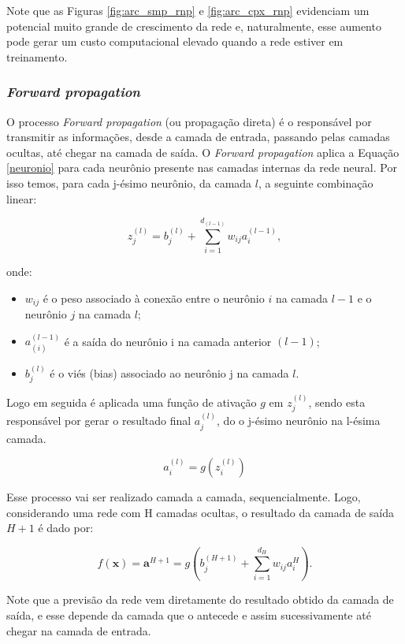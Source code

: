 Note que as Figuras \ref{fig:arc_smp_rnp} e \ref{fig:arc_cpx_rnp} evidenciam um potencial muito grande de crescimento 
da rede e, naturalmente, esse aumento pode gerar um custo computacional elevado quando a rede estiver em treinamento.

\vspace{1cm}

\subsubsection{\textit{Forward propagation}}

O processo \textit{Forward propagation} (ou propagação direta) é o responsável por transmitir as informações,
 desde a camada de entrada, passando pelas camadas ocultas, até chegar na camada de saída. O \textit{Forward propagation}
  aplica a Equação \ref{neuronio} para cada neurônio presente nas camadas internas da rede neural. 
  Por isso temos, para cada j-ésimo neurônio, da camada $l$, a seguinte combinação linear:

\[
z_{j}^{(l)} = b_{j}^{(l)} + \sum_{i=1}^{d_{(l-1)}} w_{ij}a_{i}^{(l-1)} ,
\]

\noindent onde:
\begin{itemize}
    \item $w_{ij}$ é o peso associado à conexão entre o neurônio $i$ na camada $l-1$ e o neurônio $j$ na camada $l$;
    \item $a_{(i)}^{(l-1)}$ é a saída do neurônio i na camada anterior $(l-1)$;
    \item $b_{j}^{(l)}$ é o viés (bias) associado ao neurônio j na camada $l$.
\end{itemize}

Logo em seguida é aplicada uma função de ativação $g$ em $z_{j}^{(l)}$, sendo esta responsável por gerar o
 resultado final $a_{j}^{(l)}$, do o j-ésimo neurônio na l-ésima camada.

\[a_{i}^{(l)} = g(z_{i}^{(l)})\]

Esse processo vai ser realizado camada a camada, sequencialmente. Logo, considerando uma rede com H camadas
ocultas, o resultado da camada de saída $H+1$ é dado por:

\begin{equation}
    f(\textbf{x}) = \textbf{a}^{H+1} = g(b_{j}^{(H+1)} + \sum_{i=1}^{d_{H}} w_{ij}a_{i}^{H}).
\end{equation}


Note que a previsão da rede vem diretamente do resultado obtido da camada de saída, e esse depende da camada 
que o antecede e assim sucessivamente até chegar na camada de entrada.


